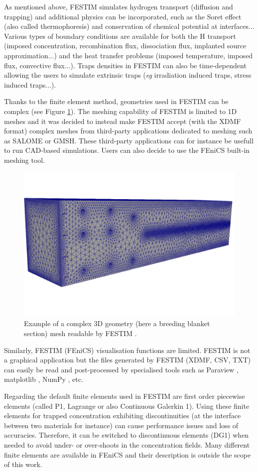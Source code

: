 As mentioned above, FESTIM simulates hydrogen transport (diffusion and trapping) and additional physics can be incorporated, such as the Soret effect (also called thermophoresis) and conservation of chemical potential at interfaces...
Various types of boundary conditions are available for both the H transport (imposed concentration, recombination flux, dissociation flux, implanted source approximation...) and the heat transfer problems (imposed temperature, imposed flux, convective flux...).
Traps densities in FESTIM can also be time-dependent allowing the users to simulate extrinsic traps (\textit{eg} irradiation induced traps, stress induced traps...).

Thanks to the finite element method, geometries used in FESTIM can be complex (see Figure \ref{fig: example mesh}).
The meshing capability of FESTIM is limited to 1D meshes and it was decided to instead make FESTIM accept (with the XDMF format) complex meshes from third-party applications dedicated to meshing such as SALOME or GMSH.
These third-party applications can for instance be usefull to run CAD-based simulations.
Users can also decide to use the FEniCS built-in meshing tool.

\begin{figure}
    \centering
    \includegraphics[width=0.5\linewidth]{Figures/Chapter2/example_mesh.png}
    \caption{Example of a complex 3D geometry (here a breeding blanket section) mesh readable by FESTIM \cite{dark_influence_2021}.}
    \label{fig: example mesh}
\end{figure}

Similarly, FESTIM (FEniCS) visualisation functions are limited.
FESTIM is not a graphical application but the files generated by FESTIM (XDMF, CSV, TXT) can easily be read and post-processed by specialised tools such as Paraview , matplotlib , NumPy , etc.

Regarding the default finite elements used in FESTIM are first order piecewise elements (called P1, Lagrange or also Continuous Galerkin 1).
Using these finite elements for trapped concentration exhibiting discontinuities (at the interface between two materials for instance) can cause performance issues and loss of accuracies.
Therefore, it can be switched to discontinuous elements (DG1) when needed to avoid under- or over-shoots in the concentration fields.
Many different finite elements are available in FEniCS \cite{noauthor_periodic_nodate} and their description is outside the scope of this work.

